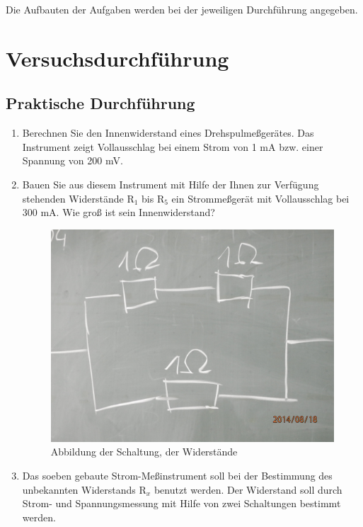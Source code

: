 \documentclass[12pt]{scrartcl}
\begin{document}
Die Aufbauten der Aufgaben werden bei der jeweiligen Durchführung angegeben.

\section{Versuchsdurchführung}


\subsection{Praktische Durchführung}

\begin{enumerate}

	\item 
	Berechnen Sie den Innenwiderstand 				eines Drehspulmeßgerätes. Das Instrument
	zeigt Vollausschlag bei einem Strom von 			1 mA bzw. einer Spannung von 200 mV.
	\item
	Bauen Sie aus diesem Instrument mit 				Hilfe der Ihnen zur Verfügung stehenden 			Widerstände $\text{R}_1$ bis 					$\text{R}_5$ ein 								Strommeßgerät mit Vollausschlag bei 300 			mA. Wie groß ist sein Innenwiderstand?
	\newpage
	\begin{figure}[htbp] 
	  \centering
	    \includegraphics[scale = 0.1]{tafel_1.JPG}
	  	\caption[Abbildung der Schaltung, der Widerstände parallel zum Drehspulinstrument]{Abbildung der Schaltung, der Widerstände}
	  \label{fig:tafel_1}
	\end{figure}
		
	
	\item
	Das soeben gebaute Strom-Meßinstrument 			soll bei der Bestimmung des unbekannten 			Widerstands $\text{R}_x$ benutzt werden. 	Der Widerstand soll durch Strom- und 			Spannungsmessung mit Hilfe von zwei 				Schaltungen bestimmt werden.
	

\end{enumerate}
\end{document}
